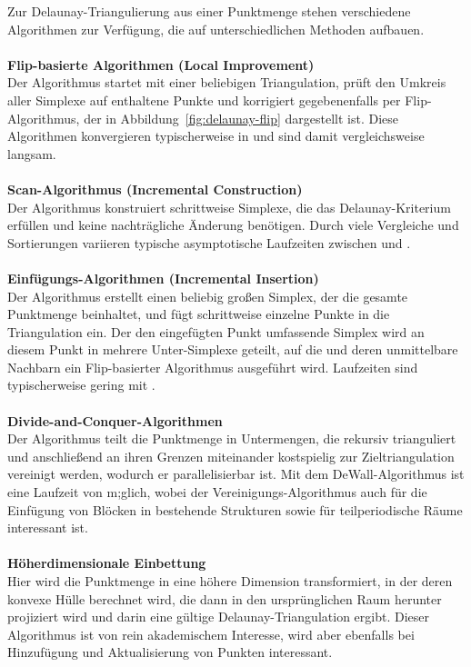 Zur Delaunay-Triangulierung aus einer Punktmenge stehen verschiedene Algorithmen zur Verfügung, die auf unterschiedlichen Methoden aufbauen.
\\\\
\textbf{Flip-basierte Algorithmen (Local Improvement)}\\
Der Algorithmus startet mit einer beliebigen Triangulation, prüft den Umkreis aller Simplexe auf enthaltene Punkte und korrigiert gegebenenfalls per Flip-Algorithmus, der in Abbildung~\ref{fig:delaunay-flip} dargestellt ist.
Diese Algorithmen konvergieren typischerweise in  und sind damit vergleichsweise langsam.
\\\\
\textbf{Scan-Algorithmus (Incremental Construction)}\\
Der Algorithmus konstruiert schrittweise Simplexe, die das Delaunay-Kriterium erfüllen und keine nachträgliche Änderung benötigen.
Durch viele Vergleiche und Sortierungen variieren typische asymptotische Laufzeiten zwischen  und .
\\\\
\textbf{Einfügungs-Algorithmen (Incremental Insertion)}\\
Der Algorithmus erstellt einen beliebig großen Simplex, der die gesamte Punktmenge beinhaltet, und fügt schrittweise einzelne Punkte in die Triangulation ein.
Der den eingefügten Punkt umfassende Simplex wird an diesem Punkt in mehrere Unter-Simplexe geteilt, auf die und deren unmittelbare Nachbarn ein Flip-basierter Algorithmus ausgeführt wird.
Laufzeiten sind typischerweise gering mit .
\\\\
\textbf{Divide-and-Conquer-Algorithmen}\\
Der Algorithmus teilt die Punktmenge in Untermengen, die rekursiv trianguliert und anschließend an ihren Grenzen miteinander kostspielig zur Zieltriangulation vereinigt werden, wodurch er parallelisierbar ist.
Mit dem DeWall-Algorithmus\cite{cignoni_dewall:_1998} ist eine Laufzeit von  m;glich, wobei der Vereinigungs-Algorithmus auch für die Einfügung von Blöcken in bestehende Strukturen sowie für teilperiodische Räume interessant ist.
\\\\
\textbf{Höherdimensionale Einbettung}\\
Hier wird die Punktmenge in eine höhere Dimension transformiert, in der deren konvexe Hülle berechnet wird, die dann in den ursprünglichen Raum herunter projiziert wird und darin eine gültige Delaunay-Triangulation ergibt.
Dieser Algorithmus ist von rein akademischem Interesse, wird aber ebenfalls bei Hinzufügung und Aktualisierung von Punkten interessant.

